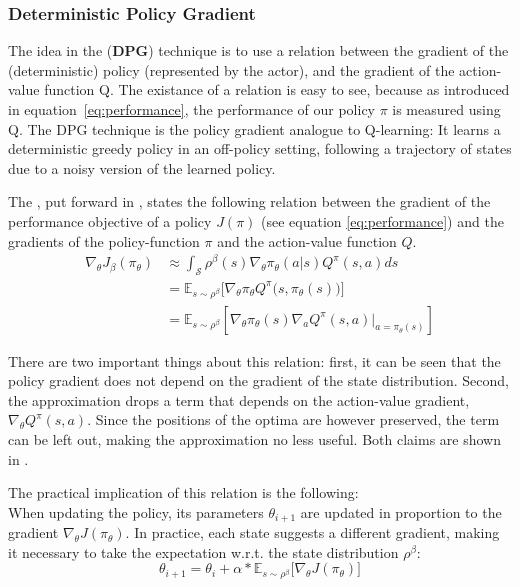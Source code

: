 \subsubsection{Deterministic Policy Gradient}

The idea in the  (\textbf{DPG}) technique is to use a relation between the gradient of the (deterministic) policy (represented by the actor), and the gradient of the action-value function Q. The existance of a relation is easy to see, because as introduced in equation~\ref{eq:performance}, the performance of our policy $\pi$ is measured using Q. The DPG technique is the policy gradient analogue to Q-learning: It learns a deterministic greedy policy in an off-policy setting, following a trajectory of states due to a noisy version of the learned policy.

The , put forward in \cite{silver_deterministic_2014}, states the following relation between the gradient of the performance objective of a policy $J(\pi)$ (see equation \ref{eq:performance}) and the gradients of the policy-function $\pi$ and the action-value function $Q$. 
\begin{align}
	\nabla_{\theta}J_\beta(\pi_\theta) &\approx \int_{\mathcal{S}} \rho^\beta(s) \nabla_\theta \pi_{\theta}(a|s)Q^\pi(s,a) ds \nonumber \\
	    &= \mathds{E}_{s\sim\rho^\beta} \Big[ \nabla_\theta \pi_\theta Q^\pi \big(s,\pi_\theta(s)\big)   \Big] \nonumber \\
		&= \mathds{E}_{s\sim\rho^\beta} \left[  \nabla_\theta \pi_{\theta}(s) \nabla_a Q^\pi(s,a) \big|_{a=\pi_\theta(s)} \right]  \label{eq:dpg}
\end{align}
\begin{flushright}
	\small There are two important things about this relation: first, it can be seen that the policy gradient does not depend on the gradient of the state distribution. Second, the approximation drops a term that depends on the action-value gradient, $\nabla_{\theta} Q^\pi(s,a)$. Since the positions of the optima are however preserved, the term can be left  out, making the approximation no less useful. Both claims are shown in \cite{silver_deterministic_2014}.\\ 
\end{flushright}

\noindent The practical implication of this relation is the following:\\
\noindent When updating the policy, its parameters $\theta_{i+1}$ are updated in proportion to the gradient $\nabla_{\theta}J(\pi_\theta)$. In practice, each state suggests a different gradient, making it necessary to take the expectation w.r.t. the state distribution $\rho^\beta$: 
\begin{equation*}
	\theta_{i+1} = \theta_i + \alpha * \mathds{E}_{s\sim\rho^\beta} \big[ \nabla_{\theta}J(\pi_\theta) \big]
\end{equation*}


